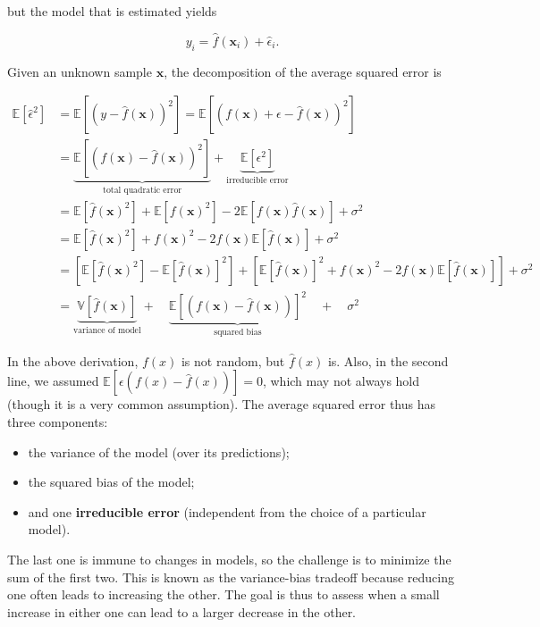 but the model that is estimated yields

\begin{equation}
y_i=\hat{f}(\textbf{x}_i)+\hat{\epsilon}_i.
\end{equation}

Given an unknown sample $\textbf{x}$, the decomposition of the average squared error is

\begin{equation}
\label{eq-biasvariance}
\begin{aligned}
\mathbb{E}[\hat{\epsilon}^2]&=\mathbb{E}[(y-\hat{f}(\textbf{x}))^2]=\mathbb{E}[(f(\textbf{x})+\epsilon-\hat{f}(\textbf{x}))^2]   \\
&= \underbrace{\mathbb{E}[(f(\textbf{x})-\hat{f}(\textbf{x}))^2]}_{\text{total quadratic error}}+\underbrace{\mathbb{E}[\epsilon^2]}_{\text{irreducible error}} \\
&= \mathbb{E}[\hat{f}(\textbf{x})^2]+\mathbb{E}[f(\textbf{x})^2]-2\mathbb{E}[f(\textbf{x})\hat{f}(\textbf{x})]+\sigma^2\\
&=\mathbb{E}[\hat{f}(\textbf{x})^2]+f(\textbf{x})^2-2f(\textbf{x})\mathbb{E}[\hat{f}(\textbf{x})]+\sigma^2\\
&=\left[ \mathbb{E}[\hat{f}(\textbf{x})^2]-\mathbb{E}[\hat{f}(\textbf{x})]^2\right]+\left[\mathbb{E}[\hat{f}(\textbf{x})]^2+f(\textbf{x})^2-2f(\textbf{x})\mathbb{E}[\hat{f}(\textbf{x})]\right]+\sigma^2\\
&=\underbrace{\mathbb{V}[\hat{f}(\textbf{x})]}_{\text{variance of model}}+ \quad \underbrace{\mathbb{E}[(f(\textbf{x})-\hat{f}(\textbf{x}))]^2}_{\text{squared bias}}\quad +\quad\sigma^2
\end{aligned}
\end{equation}

In the above derivation, $f(x)$ is not random, but $\hat{f}(x)$ is. Also, in the second line, we assumed $\mathbb{E}[\epsilon(f(x) -\hat{f}(x))]=0$, which may not always hold (though it is a very common assumption). The average squared error thus has three components:

\begin{itemize}
\item the variance of the model (over its predictions);
\item the squared bias of the model;
\item and one \textbf{irreducible error} (independent from the choice of a particular model).
\end{itemize}

The last one is immune to changes in models, so the challenge is to minimize the sum of the first two. This is known as the variance-bias tradeoff because reducing one often leads to increasing the other. The goal is thus to assess when a small increase in either one can lead to a larger decrease in the other.

